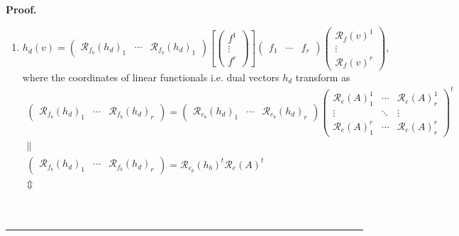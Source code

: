 \documentclass[aps,preprint]{revtex4}
\newenvironment{proof}[1][Proof]{\noindent\textbf{#1.} }{\ \rule{0.5em}{0.5em}}
\begin{document}
\begin{proof}
\begin{enumerate}
\item 
\begin{equation}
h_{d}\left( v\right) =\left( 
\begin{array}{ccc}
\mathcal{R}_{f_{b}}\left( h_{d}\right) _{1} & \cdots & \mathcal{R}%
_{f_{b}}\left( h_{d}\right) _{1}%
\end{array}%
\right) \left[ \left( 
\begin{array}{c}
f^{1} \\ 
\vdots \\ 
f^{r}%
\end{array}%
\right) \right] \left( 
\begin{array}{ccc}
f_{1} & \cdots & f_{r}%
\end{array}%
\right) \left( 
\begin{array}{c}
\mathcal{R}_{f}\left( v\right) ^{1} \\ 
\vdots \\ 
\mathcal{R}_{f}\left( v\right) ^{r}%
\end{array}%
\right) ,
\end{equation}%
where the coordinates of linear functionals i.e. dual vectors $h_{d}$
transform as 
\begin{gather}
\left( 
\begin{array}{ccc}
\mathcal{R}_{f_{b}}\left( h_{d}\right) _{1} & \cdots & \mathcal{R}%
_{f_{b}}\left( h_{d}\right) _{r}%
\end{array}%
\right) =\left( 
\begin{array}{ccc}
\mathcal{R}_{e_{b}}\left( h_{d}\right) _{1} & \cdots & \mathcal{R}%
_{e_{b}}\left( h_{d}\right) _{r}%
\end{array}%
\right) \left( 
\begin{array}{ccc}
\mathcal{R}_{e}\left( A\right) _{1}^{1} & \cdots & \mathcal{R}_{e}\left(
A\right) _{r}^{1} \\ 
\vdots & \ddots & \vdots \\ 
\mathcal{R}_{e}\left( A\right) _{1}^{r} & \cdots & \mathcal{R}_{e}\left(
A\right) _{r}^{r}%
\end{array}%
\right) ^{t} \\
\parallel \\
\left( 
\begin{array}{ccc}
\mathcal{R}_{f_{b}}\left( h_{d}\right) _{1} & \cdots & \mathcal{R}%
_{f_{b}}\left( h_{d}\right) _{r}%
\end{array}%
\right) =\mathcal{R}_{e_{b}}\left( h_{b}\right) ^{t}\mathcal{R}_{e}\left(
A\right) ^{t} \\
\Updownarrow \\

\end{gather}
\end{enumerate}
\end{proof}
\end{document}
